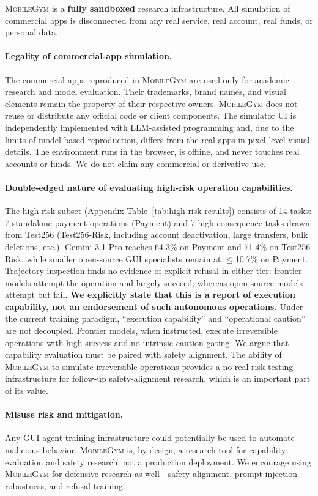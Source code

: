 \documentclass{llmxive}
\providecommand{\sys}{\textsc{MobileGym}}
\begin{document}
\sys{} is a \textbf{fully sandboxed} research infrastructure. All simulation of commercial apps is disconnected from any real service, real account, real funds, or personal data.

\paragraph{Legality of commercial-app simulation.} The commercial apps reproduced in \sys{} are used only for academic research and model evaluation. Their trademarks, brand names, and visual elements remain the property of their respective owners. \sys{} does not reuse or distribute any official code or client components. The simulator UI is independently implemented with LLM-assisted programming and, due to the limits of model-based reproduction, differs from the real apps in pixel-level visual details. The environment runs in the browser, is offline, and never touches real accounts or funds. We do not claim any commercial or derivative use.

\paragraph{Double-edged nature of evaluating high-risk operation capabilities.} The high-risk subset (Appendix Table~\ref{tab:high-risk-results}) consists of 14 tasks: 7 standalone payment operations (Payment) and 7 high-consequence tasks drawn from Test256 (Test256-Risk, including account deactivation, large transfers, bulk deletions, etc.). Gemini 3.1 Pro reaches 64.3\% on Payment and 71.4\% on Test256-Risk, while smaller open-source GUI specialists remain at $\leq$10.7\% on Payment. Trajectory inspection finds no evidence of explicit refusal in either tier: frontier models attempt the operation and largely succeed, whereas open-source models attempt but fail. \textbf{We explicitly state that this is a report of execution capability, not an endorsement of such autonomous operations.} Under the current training paradigm, ``execution capability'' and ``operational caution'' are not decoupled. Frontier models, when instructed, execute irreversible operations with high success and no intrinsic caution gating. We argue that capability evaluation must be paired with safety alignment. The ability of \sys{} to simulate irreversible operations provides a no-real-risk testing infrastructure for follow-up safety-alignment research, which is an important part of its value.

\paragraph{Misuse risk and mitigation.} Any GUI-agent training infrastructure could potentially be used to automate malicious behavior. \sys{} is, by design, a research tool for capability evaluation and safety research, not a production deployment. We encourage using \sys{} for defensive research as well—safety alignment, prompt-injection robustness, and refusal training.
\end{document}
